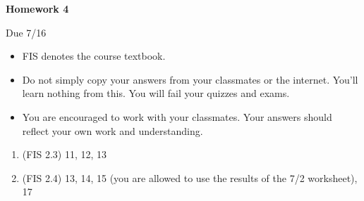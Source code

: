 \documentclass{article}
\begin{document}
\begin{center}
    {\bf Homework 4}
    
    Due 7/16
\end{center}

\begin{itemize}
    \item 
        FIS denotes the course textbook.
    \item
        Do not simply copy your answers from your classmates or the internet.
        You'll learn nothing from this. You will fail your quizzes and exams.
    \item
        You are encouraged to work with your classmates. Your answers
        should reflect your own work and understanding.
\end{itemize}

\begin{enumerate}
    \item
        (FIS 2.3) 11, 12, 13
    \item
        (FIS 2.4) 13, 14, 15 (you are allowed to use the results of the 7/2
        worksheet), 17
\end{enumerate}
    
\end{document}
